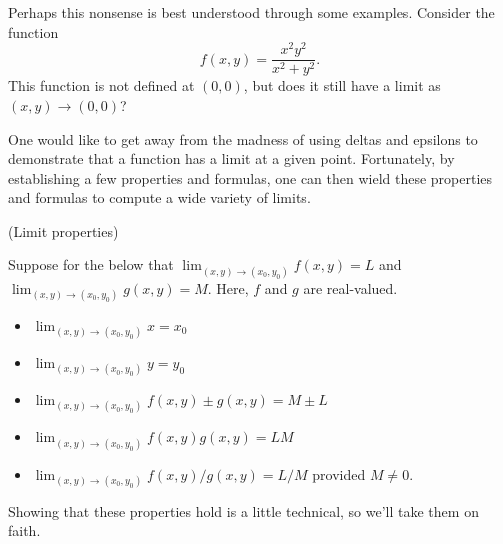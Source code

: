 \documentclass{article}
\begin{document}
Perhaps this nonsense is best understood through some examples. Consider the function 
\[f(x,y)=\frac{x^2 y^2}{x^2+y^2}.\]
This function is not defined at $(0,0)$, but does it still have a limit as $(x,y) \to (0,0)$? 

One would like to get away from the madness of using deltas and epsilons to demonstrate that a function
has a limit at a given point. Fortunately, by establishing a few properties and formulas, one can then wield
these properties and formulas to compute a wide variety of limits.

\begin{proposition} (Limit properties)


Suppose for the below that $\lim_{(x,y) \to (x_0,y_0)} f(x,y) = L$ and $\lim_{(x,y) \to (x_0,y_0)} g(x,y) = M$. Here,
$f$ and $g$ are real-valued.
    \begin{itemize}
        \item $\lim_{(x,y) \to (x_0,y_0)} x = x_0$ 
        \item $\lim_{(x,y) \to (x_0,y_0)} y = y_0$
        \item $\lim_{(x,y) \to (x_0,y_0)} f(x,y) \pm g(x,y) = M \pm L$
        \item $\lim_{(x,y) \to (x_0,y_0)} f(x,y)g(x,y) = LM$
        \item $\lim_{(x,y) \to (x_0,y_0)} f(x,y)/g(x,y) = L/M$ provided $M\neq 0$.
    \end{itemize}
\end{proposition}

Showing that these properties hold is a little technical, so we'll take them on faith.
\end{document}

